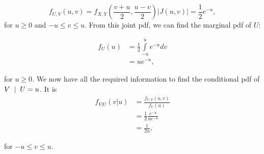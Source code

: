 \documentclass{article}
\begin{document}
$$f_{U,V}(u,v) = f_{X,Y}\left(\frac{v+u}{2}, \frac{u-v}{2}\right)|J(u,v)| = \frac{1}{2}e^{-u},$$
for $u\geq 0$ and $-u\leq v \leq u$.  From this joint pdf, we can find the marginal pdf of $U$:

\begin{align*}
f_U(u) &= \frac{1}{2}\int\limits_{-u}^{u} e^{-u} dv \\
&= ue^{-u},
\end{align*}

\noindent for $u\geq 0$.  We now have all the required information to find the conditional pdf of $V\hspace{2mm}|\hspace{2mm}U=u$.  It is
\begin{align*}
f_{V|U}(v|u) &= \frac{f_{U,V}(u,v)}{f_U(u)}  \\
&= \frac{1}{2}\frac{e^{-u}}{ue^{-u}} \\
&= \frac{1}{2u},
\end{align*}

\noindent for $-u \leq v \leq u$.  
\end{document}
